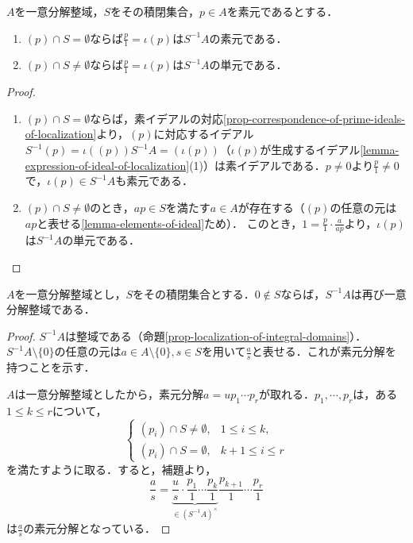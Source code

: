 \documentclass[uplatex,dvipdfmx]{jsreport}
\begin{document}
\begin{lemma}
    $A$を一意分解整域，$S$をその積閉集合，$p\in A$を素元であるとする．
    \begin{enumerate}
        \item $(p)\cap S=\emptyset$ならば$\frac{p}{1}=\iota(p)$は$S^{-1}A$の素元である．
        \item $(p)\cap S\ne\emptyset$ならば$\frac{p}{1}=\iota(p)$は$S^{-1}A$の単元である．
    \end{enumerate}
\end{lemma}
\begin{proof}\mbox{}
    \begin{enumerate}
        \item $(p)\cap S=\emptyset$ならば，素イデアルの対応\ref{prop-correspondence-of-prime-ideals-of-localization}より，$(p)$に対応するイデアル$S^{-1}(p)=\iota((p))S^{-1}A=(\iota(p))$（$\iota(p)$が生成するイデアル\ref{lemma-expression-of-ideal-of-localization}(1)）は素イデアルである．$p\ne 0$より$\frac{p}{1}\ne 0$で，$\iota(p)\in S^{-1}A$も素元である．
        \item $(p)\cap S\ne\emptyset$のとき，$ap\in S$を満たす$a\in A$が存在する（$(p)$の任意の元は$ap$と表せる\ref{lemma-elements-of-ideal}ため）．
        このとき，$1=\frac{p}{1}\cdot\frac{a}{ap}$より，$\iota(p)$は$S^{-1}A$の単元である．
    \end{enumerate}
\end{proof}

\begin{proposition}
    $A$を一意分解整域とし，$S$をその積閉集合とする．$0\notin S$ならば，$S^{-1}A$は再び一意分解整域である．
\end{proposition}
\begin{proof}
    $S^{-1}A$は整域である（命題\ref{prop-localization-of-integral-domains}）．
    $S^{-1}A\setminus\{0\}$の任意の元は$a\in A\setminus\{0\},s\in S$を用いて$\frac{a}{s}$と表せる．これが素元分解を持つことを示す．

    $A$は一意分解整域としたから，素元分解$a=up_1\cdots p_r$が取れる．$p_1,\cdots,p_r$は，ある$1\le k\le r$について，
    \[\begin{cases}
        (p_i)\cap S\ne\emptyset,&1\le i\le k,\\
        (p_i)\cap S=\emptyset,&k+1\le i\le r
    \end{cases}\]
    を満たすように取る．すると，補題より，
    \[\frac{a}{s}=\underbrace{\frac{u}{s}\cdot\frac{p_1}{1}\cdots\frac{p_k}{1}}_{\in(S^{-1}A)^\times}\frac{p_{k+1}}{1}\cdots\frac{p_r}{1}\]
    は$\frac{a}{s}$の素元分解となっている．
\end{proof}
\end{document}
